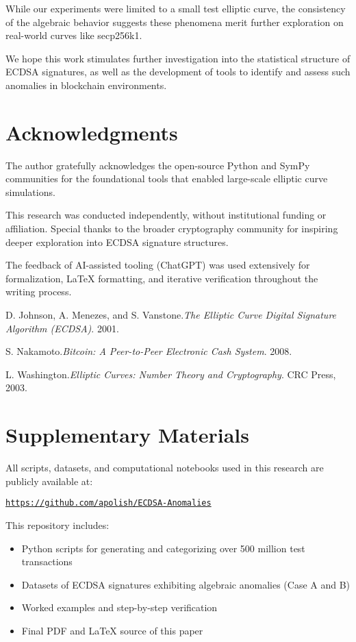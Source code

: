 \documentclass[11pt]{article}
\begin{document}
While our experiments were limited to a small test elliptic curve, the consistency of the algebraic behavior suggests these phenomena merit further exploration on real-world curves like secp256k1.

We hope this work stimulates further investigation into the statistical structure of ECDSA signatures, as well as the development of tools to identify and assess such anomalies in blockchain environments.

\section*{Acknowledgments}
The author gratefully acknowledges the open-source Python and SymPy communities for the foundational tools that enabled large-scale elliptic curve simulations.

This research was conducted independently, without institutional funding or affiliation. Special thanks to the broader cryptography community for inspiring deeper exploration into ECDSA signature structures.

The feedback of AI-assisted tooling (ChatGPT) was used extensively for formalization, LaTeX formatting, and iterative verification throughout the writing process.

\begin{thebibliography}{9}
D. Johnson, A. Menezes, and S. Vanstone.\textit{The Elliptic Curve Digital Signature Algorithm (ECDSA)}. 2001.

S. Nakamoto.\textit{Bitcoin: A Peer-to-Peer Electronic Cash System}. 2008.

L. Washington.\textit{Elliptic Curves: Number Theory and Cryptography}. CRC Press, 2003.
\end{thebibliography}

\section*{Supplementary Materials}

All scripts, datasets, and computational notebooks used in this research are publicly available at:

\texttt{\url{https://github.com/apolish/ECDSA-Anomalies}}

This repository includes:
\begin{itemize}
  \item Python scripts for generating and categorizing over 500 million test transactions
  \item Datasets of ECDSA signatures exhibiting algebraic anomalies (Case A and B)
  \item Worked examples and step-by-step verification
  \item Final PDF and LaTeX source of this paper
\end{itemize}
\end{document}
